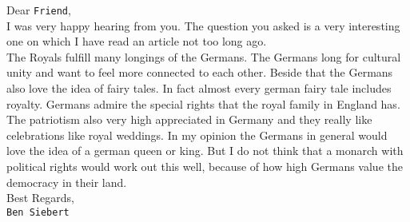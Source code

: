 \documentclass[12pt, a4paper]{report}
\newenvironment{gblock}[1]{
    \tcolorbox[beamer,
        noparskip,
        colback=green!75!,
        colbacklower=green!75!green,
        title=#1]}
{\endtcolorbox}
\newcommand{\friend}[0]{\texttt{Friend}}
\newcommand{\me}[0]{\texttt{Ben Siebert}}
\begin{document}
	\begin{gblock}{Subject: \texttt{RE: Would the Germans like a king or a Queen?} \\ To: \texttt{my-friend@english-class.co.uk}}
		Dear \friend, \\
		I was very happy hearing from you.
		The question you asked is a very interesting one on which I have read an article not too long ago. \\
		The Royals fulfill many longings of the Germans.
		The Germans long for cultural unity and want to feel more connected to each other.
		Beside that the Germans also love the idea of fairy tales.
		In fact almost every german fairy tale includes royalty.
		Germans admire the special rights that the royal family in England has. 
		The patriotism  also very high appreciated in Germany and they really like celebrations like royal weddings.
		In my opinion the Germans in general would love the idea of a german queen or king.
		But I do not think that a monarch with political rights would work out this well, because of how high Germans value the democracy in their land.
		\\
		Best Regards, \\
		\me
	\end{gblock}
\end{document}
